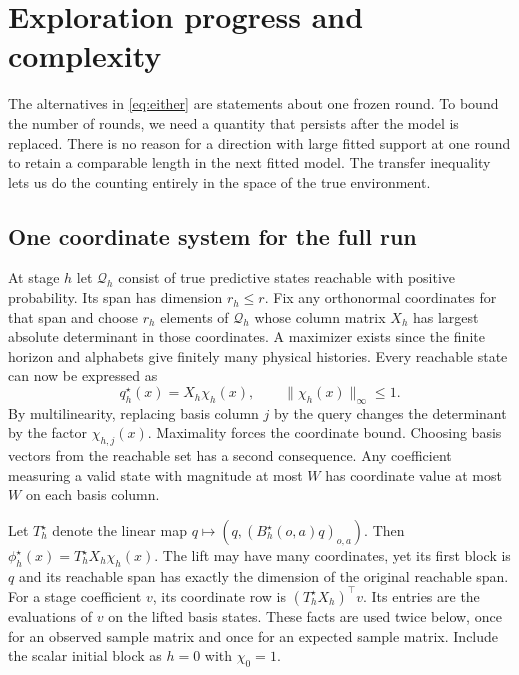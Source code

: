\section{Exploration progress and complexity}\label{sec:progress}
The alternatives in \eqref{eq:either} are statements about one frozen round. To bound the number of rounds, we need a quantity that persists after the model is replaced. There is no reason for a direction with large fitted support at one round to retain a comparable length in the next fitted model. The transfer inequality lets us do the counting entirely in the space of the true environment.

\subsection{One coordinate system for the full run}
At stage $h$ let $\mathcal Q_h$ consist of true predictive states reachable with positive probability. Its span has dimension $r_h\le r$. Fix any orthonormal coordinates for that span and choose $r_h$ elements of $\mathcal Q_h$ whose column matrix $X_h$ has largest absolute determinant in those coordinates. A maximizer exists since the finite horizon and alphabets give finitely many physical histories. Every reachable state can now be expressed as
\[
 q_h^\star(x)=X_h\chi_h(x),\qquad \|\chi_h(x)\|_\infty\le1 .
\]
By multilinearity, replacing basis column $j$ by the query changes the determinant by the factor $\chi_{h,j}(x)$. Maximality forces the coordinate bound. Choosing basis vectors from the reachable set has a second consequence. Any coefficient measuring a valid state with magnitude at most $W$ has coordinate value at most $W$ on each basis column.

Let $T_h^\star$ denote the linear map $q\mapsto(q,(B_h^\star(o,a)q)_{o,a})$. Then $\phi_h^\star(x)=T_h^\star X_h\chi_h(x)$. The lift may have many coordinates, yet its first block is $q$ and its reachable span has exactly the dimension of the original reachable span. For a stage coefficient $v$, its coordinate row is $(T_h^\star X_h)^\top v$. Its entries are the evaluations of $v$ on the lifted basis states. These facts are used twice below, once for an observed sample matrix and once for an expected sample matrix. Include the scalar initial block as $h=0$ with $\chi_0=1$.


